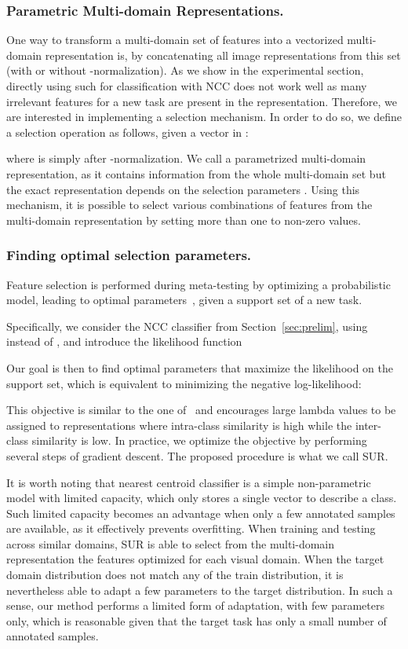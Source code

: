 \documentclass[runningheads]{llncs}
\begin{document}
\subsubsection{Parametric Multi-domain Representations.}
One way to transform a multi-domain set of features into a vectorized multi-domain
representation  is, by concatenating all image representations
from this set (with or without -normalization). As we show in the
experimental section, directly using such  for classification with NCC does not
work well as many irrelevant features for a new task are present in the representation. 
Therefore, we are interested in implementing a selection mechanism.
In order to do so, we define a selection operation  as
follows, given a vector  in :


where  is simply  after -normalization.
We call  a parametrized multi-domain
representation, as it contains information from the whole multi-domain set but the
exact representation depends on the selection parameters .
Using this mechanism, it is possible
to select various combinations of features from the multi-domain representation by
setting more than one  to non-zero values.


\subsubsection{Finding optimal selection parameters.}
Feature selection is performed during meta-testing by optimizing a probabilistic model,
leading to optimal
parameters~, given a support set  of a new task.

Specifically, we consider the NCC classifier from Section~\ref{sec:prelim},
using  instead of , and introduce the likelihood function
 
Our goal is then to find optimal parameters  that
maximize  the likelihood on the support set, which is equivalent to
minimizing the negative log-likelihood:

This objective is similar to the one of~\cite{wang2018cosface} and encourages
large lambda values to be assigned to representations where intra-class similarity is high
while the inter-class similarity is low. In practice, we optimize the objective
by performing several steps of gradient descent. The proposed procedure is what
we call SUR.

It is worth noting that nearest centroid classifier is a simple non-parametric
model with limited capacity, which only stores a single vector to describe a
class. Such limited capacity becomes an advantage when only a few annotated
samples are available, as it effectively prevents overfitting. When training
and testing across similar domains, SUR is able to select from the multi-domain
representation the features optimized for each visual domain. 
When the target domain distribution does not match any of the train distribution,
it is nevertheless able to adapt a few parameters  to the target distribution.
In such a sense, our method performs a limited form of adaptation, with
few parameters only, which is reasonable given that the target task has only a
small number of annotated samples.
\end{document}
